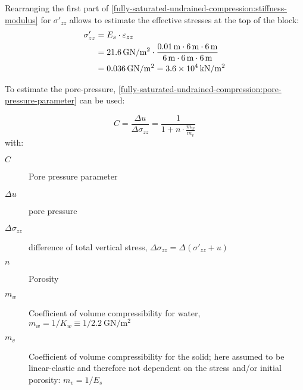 Rearranging the first part of
\autoref{fully-saturated-undrained-compression:stiffness-modulus} for
$\sigma'_{zz}$ allows to estimate the effective stresses at the top of the
block:
\begin{equation}
    \label{fully-saturated-undrained-compression:effective_vertical_stress}
    \begin{split}
        \sigma'_{zz} & = E_s \cdot \varepsilon_{zz}                                                                                                                                                                               \\
                     & = \SI{21.6}{\si[per-mode = symbol]{\giga\newton\per\square\metre}} \cdot \frac{ \SI{0.01}{\metre} \cdot \SI{6}{\metre} \cdot \SI{6}{\metre} }{ \SI{6}{\metre} \cdot  \SI{6}{\metre} \cdot  \SI{6}{\metre}} \\
                     & = \SI{0.036}{\si[per-mode = symbol]{\giga\newton\per\square\metre}} = \SI{3.6E4}{\si[per-mode = symbol]{\kilo\newton\per\square\metre}}
    \end{split}
\end{equation}

\vspace{1em}

To estimate the pore-pressure,
\autoref{fully-saturated-undrained-compression:pore-pressure-parameter} can be
used:

\begin{equation}
    \label{fully-saturated-undrained-compression:pore-pressure-parameter}
    C = \frac{\Delta u}{\Delta \sigma_{zz}} = \frac{1}{1 + n \cdot \frac{m_w}{m_v}}
\end{equation}
with:
\begin{description}
    \item[$C$] Pore pressure parameter
    \item[$\Delta u$] pore pressure
    \item[$\Delta \sigma_{zz}$] difference of total vertical stress, $\Delta \sigma_{zz} = \Delta (\sigma'_{zz} + u)$
    \item[$n$] Porosity
    \item[$m_w$] Coefficient of volume compressibility for water, $m_w = 1/K_w \equiv 1/{\SI[per-mode = symbol]{2.2}{\giga\newton\per\square\metre}}$
    \item[$m_v$] Coefficient of volume compressibility for the solid; here assumed to be linear-elastic and therefore not dependent on the stress and/or initial porosity: $m_v = 1 / E_s$
\end{description}

